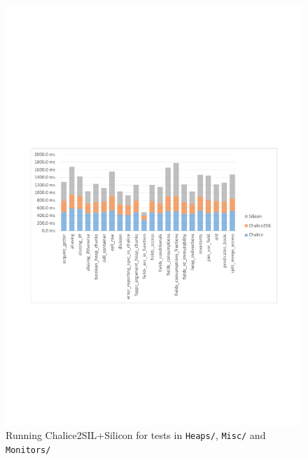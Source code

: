 \begin{figure}
\includegraphics[width=145mm]{src/data/groups-4-6.pdf}
\caption{Running Chalice2SIL+Silicon for tests in \texttt{Heaps/}, \texttt{Misc/} and \texttt{Monitors/}}\label{fig:perf-grp-4-6}
\end{figure}

